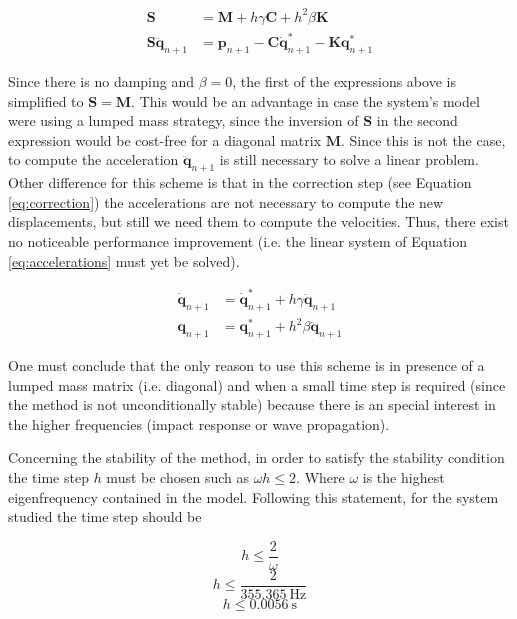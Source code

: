 \documentclass[AMdocument,optEnglish]{AMlatex}  %
\begin{document}
\begin{equation}
\begin{aligned}
\bm{S} &= \bm{M} + h \gamma \bm{C} + h^2 \beta \bm{K} \\
\bm{S} \ddot{\bm{q}}_{n+1} &= \bm{p}_{n+1} - \bm{C} \dot{\bm{q}}^\ast_{n+1} - \bm{K} \bm{q}^\ast_{n+1}
\end{aligned}
\label{eq:accelerations}
 \end{equation}
 
 Since there is no damping and $\beta = 0$, the first of the expressions above is simplified to $\bm{S} = \bm{M}$. This would be an advantage in case the system's model were using a lumped mass strategy, since the inversion of $\bm{S}$ in the second expression would be cost-free for a diagonal matrix $\bm{M}$. Since this is not the case, to compute the acceleration $\ddot{\bm{q}}_{n+1}$ is still necessary to solve a linear problem. Other difference for this scheme is that in the correction step (see Equation \ref{eq:correction}) the accelerations are not necessary to compute the new displacements, but still we need them to compute the velocities. Thus, there exist no noticeable performance improvement (i.e. the linear system of Equation \ref{eq:accelerations} must yet be solved).
 
 \begin{equation}
 \begin{aligned}
 \dot{\bm{q}}_{n+1} &= \dot{\bm{q}}^\ast_{n+1} + h \gamma \ddot{\bm{q}}_{n+1} \\
 \bm{q}_{n+1} &=  \bm{q}^\ast_{n+1} + h^2 \beta \ddot{\bm{q}}_{n+1} 
 \label{eq:correction}
\end{aligned}
\end{equation}
 
 One must conclude that the only reason to use this scheme is in presence of a lumped mass matrix (i.e. diagonal) and when a small time step is required (since the method is not unconditionally stable) because there is an special interest in the higher frequencies (impact response or wave propagation).
 
 Concerning the stability of the method, in order to satisfy the stability condition the time step $h$ must be chosen such as $\omega h \leq 2$. Where $\omega$ is the highest eigenfrequency contained in the model. Following this statement, for the system studied the time step should be 
 
$$h \leq \frac{2}{\omega}$$
$$h \leq \frac{2}{\SI{355.365}{\hertz}}$$
$$h \leq \SI{0.0056}{\second}$$
\end{document}
